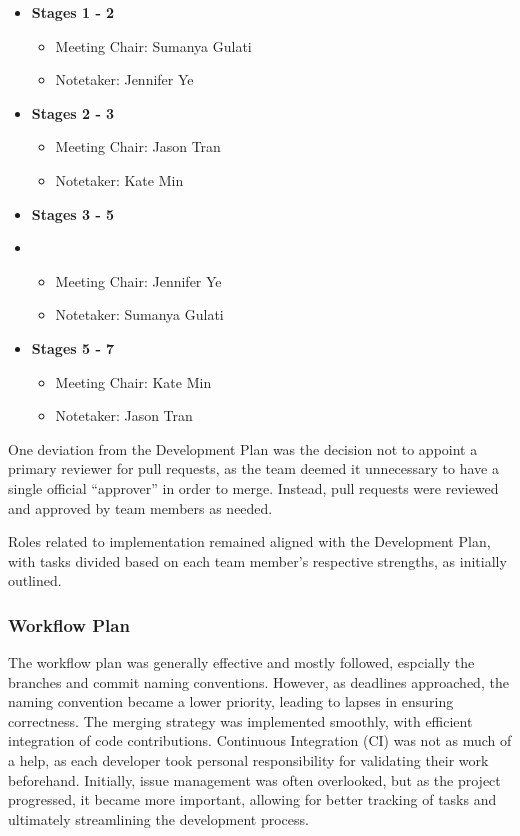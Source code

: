 \documentclass{article}
\begin{document}
\begin{itemize}
    \item \textbf{Stages 1 - 2}
        \begin{itemize}
            \item Meeting Chair: Sumanya Gulati
            \item Notetaker: Jennifer Ye
        \end{itemize}
    \item \textbf{Stages 2 - 3}
        \begin{itemize}
            \item Meeting Chair: Jason Tran
            \item Notetaker: Kate Min
        \end{itemize}
    \item \textbf{Stages 3 - 5}
    \item \begin{itemize}
            \item Meeting Chair: Jennifer Ye
            \item Notetaker: Sumanya Gulati
        \end{itemize}
    \item \textbf{Stages 5 - 7}
        \begin{itemize}
            \item Meeting Chair: Kate Min
            \item Notetaker: Jason Tran
        \end{itemize}
\end{itemize}

One deviation from the Development Plan was the decision not to appoint a
primary reviewer for pull requests, as the team deemed it unnecessary to have a
single official ``approver'' in order to merge. Instead, pull requests were
reviewed and approved by team members as needed.

Roles related to implementation remained aligned with the Development Plan, with
tasks divided based on each team member's respective strengths, as initially
outlined.

\subsubsection{Workflow Plan}
The workflow plan was generally effective and mostly followed, espcially the
branches and commit naming conventions. However, as deadlines approached, the
naming convention became a lower priority, leading to lapses in ensuring
correctness. The merging strategy was implemented smoothly, with efficient
integration of code contributions. Continuous Integration (CI) was not as much
of a help, as each developer took personal responsibility for validating their
work beforehand. Initially, issue management was often overlooked, but as the
project progressed, it became more important, allowing for better tracking of
tasks and ultimately streamlining the development process. 
\end{document}
